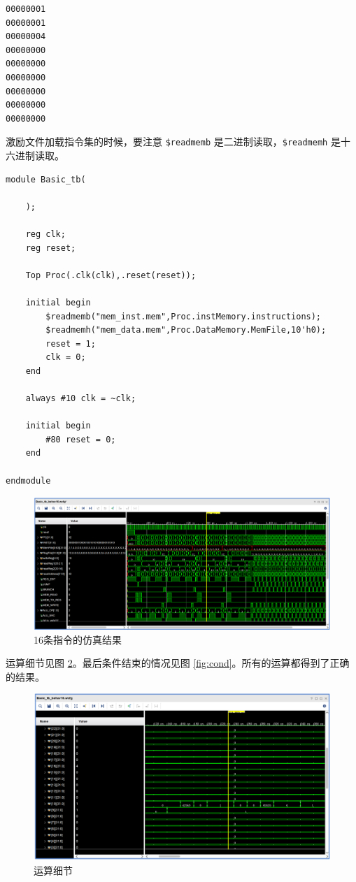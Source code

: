 \documentclass[a4paper,UTF8]{ctexart}
\providecommand{\code}[2]{}
\begin{document}
    \code{simple.asm}{}
    \begin{lstlisting}[caption=mem\_data.mem]
00000001
00000001
00000004
00000000
00000000
00000000
00000000
00000000
00000000
    \end{lstlisting}

激励文件加载指令集的时候，要注意 \verb"$readmemb" 是二进制读取，\verb"$readmemh" 是十六进制读取。

\begin{lstlisting}[caption=Basic\_tb.v]
module Basic_tb(

    );

    reg clk;
    reg reset;

    Top Proc(.clk(clk),.reset(reset));

    initial begin
        $readmemb("mem_inst.mem",Proc.instMemory.instructions);
        $readmemh("mem_data.mem",Proc.DataMemory.MemFile,10'h0);
        reset = 1;
        clk = 0;
    end

    always #10 clk = ~clk;

    initial begin
        #80 reset = 0;
    end

endmodule
\end{lstlisting}

\begin{figure}[H]
    \centering
    \includegraphics[width=\textwidth]{figure2.png}
    \caption{16条指令的仿真结果}
    \label{fig:16}
\end{figure}

运算细节见图 \ref{fig:calcde}。最后条件结束的情况见图 \ref{fig:cond}。所有的运算都得到了正确的结果。

\begin{figure}[H]
    \centering
    \includegraphics[width=\textwidth]{calcdetail.png}
    \caption{运算细节}
    \label{fig:calcde}
\end{figure}
\end{document}
